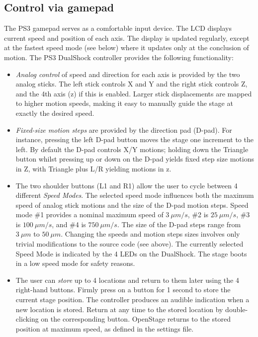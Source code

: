 \documentclass[11pt]{report} %
\begin{document}
\subsection{Control via gamepad}
The PS3 gamepad serves as a comfortable input device. The LCD displays current speed and position of each axis. The display is updated regularly, except at the fastest speed mode (see below) where it updates only at the conclusion of motion. 
The PS3 DualShock controller provides the following functionality:

\begin{itemize}
\item \textit{Analog control} of speed and direction for each axis is
  provided by the two analog sticks. The left stick controls X and Y and the right stick controls Z, and the 4th axis (z) if this is enabled. Larger stick displacements are mapped to higher motion speeds, making it easy to manually guide the stage at exactly the desired speed.
\item \textit{Fixed-size motion steps} are provided by the direction
  pad (D-pad). For instance,
  pressing the left D-pad button moves the stage one increment to the
  left. By default the D-pad controls X/Y motions; holding down the
  Triangle button whilst pressing up or down on the D-pad yields fixed
  step size motions in Z, with Triangle plus L/R yielding motions in z. 
\item The two shoulder buttons (L1 and R1) allow the user to cycle between 4
  different \textit{Speed Modes}. The selected speed mode influences
  both the maximum speed of analog stick motions and the size of the
  D-pad motion steps. Speed mode \#1 provides a nominal maximum speed
  of $3~\mu m/s$, \#2 is $25~\mu m/s$, \#3 is $100~\mu m/s$, and \#4 is
  $750~\mu m/s$. The size of the D-pad steps range from $3~\mu m$ to
  $50~\mu m$. Changing the speeds and motion steps sizes involves only
  trivial modifications to the source code (see above). The currently selected
  Speed Mode is indicated by the 4 LEDs on the DualShock. The stage boots in a low speed mode for safety reasons. 
\item The user can \textit{store} up to 4 locations and return to them
  later using the 4 right-hand buttons. Firmly press on a button for 1 second to store the current stage position. The controller produces an audible
  indication when a new location is stored. Return at any
  time to the stored location by double-clicking on the corresponding
  button. OpenStage returns to the stored position at maximum speed, as defined in the settings file. 
\end{itemize}
\end{document}
